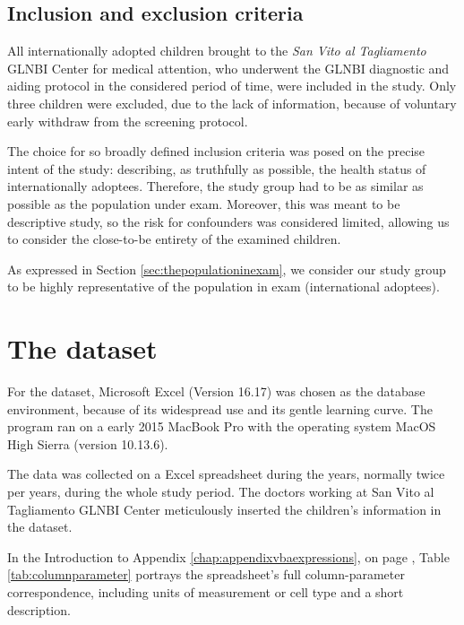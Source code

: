 \subsection{Inclusion and exclusion criteria}\label{sub:inclusionandexclusioncriteria}
All internationally adopted children brought to the \textit{San Vito al Tagliamento} GLNBI Center for medical attention, who underwent the GLNBI diagnostic and aiding protocol in the considered period of time, were included in the study. Only three children were excluded, due to the lack of information, because of voluntary early withdraw from the screening protocol.

The choice for so broadly defined inclusion criteria was posed on the precise intent of the study: describing, as truthfully as possible, the health status of internationally adoptees. Therefore, the study group had to be as similar as possible as the population under exam. Moreover, this was meant to be descriptive study, so the risk for confounders was considered limited, allowing us to consider the close-to-be entirety of the examined children.

As expressed in Section \ref{sec:thepopulationinexam}, we consider our study group to be highly representative of the population in exam (international adoptees).

\section{The dataset}\label{sec:dataset}
For the dataset, Microsoft Excel (Version 16.17) was chosen as the database environment, because of its widespread use and its gentle learning curve. The program ran on a early 2015 MacBook Pro with the operating system MacOS High Sierra (version 10.13.6).

The data was collected on a Excel spreadsheet during the years, normally twice per years, during the whole study period. The doctors working at San Vito al Tagliamento GLNBI Center meticulously inserted the children's information in the dataset.

In the Introduction to Appendix \ref{chap:appendixvbaexpressions}, on page \pageref{chap:appendixvbaexpressions}, Table \ref{tab:columnparameter} portrays the spreadsheet's full column-parameter correspondence, including units of measurement or cell type and a short description.

